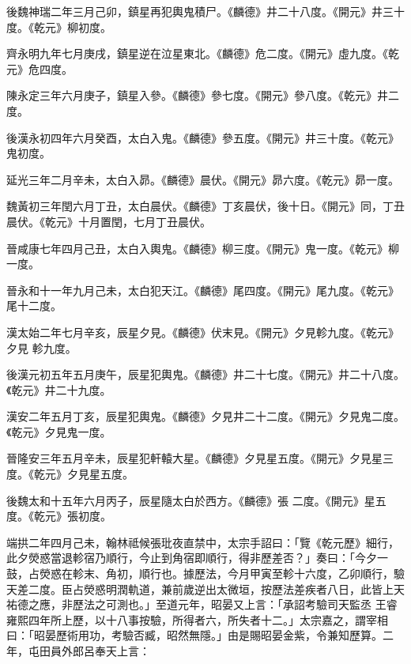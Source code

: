 \begin{pinyinscope}
 後魏神瑞二年三月己卯，鎮星再犯輿鬼積尸。《麟德》井二十八度。《開元》井三十度。《乾元》柳初度。



 齊永明九年七月庚戌，鎮星逆在泣星東北。《麟德》危二度。《開元》虛九度。《乾元》危四度。



 陳永定三年六月庚子，鎮星入參。《麟德》參七度。《開元》參八度。《乾元》井二度。



 後漢永初四年六月癸酉，太白入鬼。《麟德》參五度。《開元》井三十度。《乾元》鬼初度。



 延光三年二月辛未，太白入昴。《麟德》晨伏。《開元》昴六度。《乾元》昴一度。



 魏黃初三年閏六月丁丑，太白晨伏。《麟德》丁亥晨伏，後十日。《開元》同，丁丑晨伏。《乾元》十月置閏，七月丁丑晨伏。



 晉咸康七年四月己丑，太白入輿鬼。《麟德》柳三度。《開元》鬼一度。《乾元》柳一度。



 晉永和十一年九月己未，太白犯天江。《麟德》尾四度。《開元》尾九度。《乾元》尾十二度。



 漢太始二年七月辛亥，辰星夕見。《麟德》伏末見。《開元》夕見軫九度。《乾元》夕見
 軫九度。



 後漢元初五年五月庚午，辰星犯輿鬼。《麟德》井二十七度。《開元》井二十八度。《乾元》井二十九度。



 漢安二年五月丁亥，辰星犯輿鬼。《麟德》夕見井二十二度。《開元》夕見鬼二度。《乾元》夕見鬼一度。



 晉隆安三年五月辛未，辰星犯軒轅大星。《麟德》夕見星五度。《開元》夕見星三度。《乾元》夕見星五度。



 後魏太和十五年六月丙子，辰星隨太白於西方。《麟德》張
 二度。《開元》星五度。《乾元》張初度。



 端拱二年四月己未，翰林祗候張玭夜直禁中，太宗手詔曰：「覽《乾元歷》細行，此夕熒惑當退軫宿乃順行，今止到角宿即順行，得非歷差否？」奏曰：「今夕一鼓，占熒惑在軫末、角初，順行也。據歷法，今月甲寅至軫十六度，乙卯順行，驗天差二度。臣占熒惑明潤軌道，兼前歲逆出太微垣，按歷法差疾者八日，此皆上天祐德之應，非歷法之可測也。」至道元年，昭晏又上言：「承詔考驗司天監丞
 王睿雍熙四年所上歷，以十八事按驗，所得者六，所失者十二。」太宗嘉之，謂宰相曰：「昭晏歷術用功，考驗否臧，昭然無隱。」由是賜昭晏金紫，令兼知歷算。二年，屯田員外郎呂奉天上言：




\end{pinyinscope}
